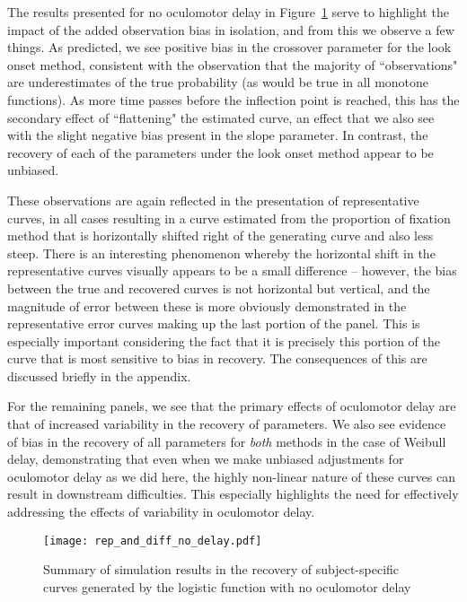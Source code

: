 The results presented for no oculomotor delay in Figure~\ref{fig:panel_no_delay} serve to highlight the impact of the added observation bias in isolation, and from this we observe a few things. As predicted, we see positive bias in the crossover parameter for the look onset method, consistent with the observation that the majority of ``observations" are underestimates of the true probability (as would be true in all monotone functions). As more time passes before the inflection point is reached, this has the secondary effect of ``flattening" the estimated curve, an effect that we also see with the slight negative bias present in the slope parameter. In contrast, the recovery of each of the parameters under the look onset method appear to be unbiased.

These observations are again reflected in the presentation of representative curves, in all cases resulting in a curve estimated from the proportion of fixation method that is horizontally shifted right of the generating curve and also less steep. There is an interesting phenomenon whereby the horizontal shift in the representative curves visually appears to be a small difference -- however, the bias between the true and recovered curves is not horizontal but vertical, and the magnitude of error between these is more obviously demonstrated in the representative error curves making up the last portion of the panel. This is especially important considering the fact that it is precisely this portion of the curve that is most sensitive to bias in recovery. The consequences of this are discussed briefly in the appendix. 

For the remaining panels, we see that the primary effects of oculomotor delay are that of increased variability in the recovery of parameters. We also see evidence of bias in the recovery of all parameters for \textit{both} methods in the case of Weibull delay, demonstrating that even when we make unbiased adjustments for oculomotor delay as we did here, the highly non-linear nature of these curves can result in downstream difficulties. This especially highlights the need for effectively addressing the effects of variability in oculomotor delay.

\begin{figure}[H]
\centering
\texttt{[image: rep\_and\_diff\_no\_delay.pdf]}
\caption{Summary of simulation results in the recovery of subject-specific curves generated by the logistic function with no oculomotor delay}
\label{fig:panel_no_delay}
\end{figure}


